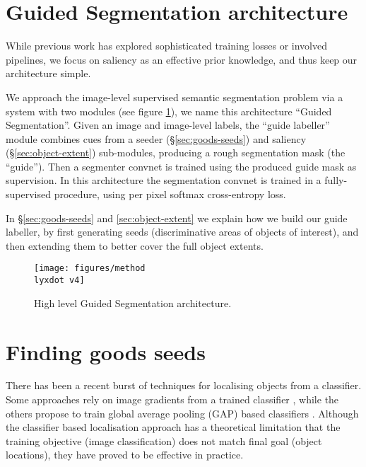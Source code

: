 \documentclass[british,10pt,twocolumn,letterpaper]{article}
\newcommand{\lyxdot}{.}
\begin{document}
\section{\label{sec:architecture} Guided Segmentation architecture}

While previous work has explored sophisticated training losses
or involved pipelines, we focus on saliency as an effective
prior knowledge, and thus keep our architecture simple.

We approach the image-level supervised semantic segmentation problem
via a system with two modules (see figure \ref{fig:high-level-architecture}),
we name this architecture ``Guided Segmentation''. Given an image
and image-level labels, the ``guide labeller'' module combines cues
from a seeder (\S\ref{sec:goods-seeds}) and saliency (\S\ref{sec:object-extent})
sub-modules, producing a rough segmentation mask (the ``guide'').
Then a segmenter convnet is trained using the produced guide mask
as supervision. In this architecture the segmentation convnet is trained
in a fully-supervised procedure, using per pixel softmax
cross-entropy loss. 

In \S \ref{sec:goods-seeds} and \ref{sec:object-extent} we
explain how we build our guide labeller, by first generating seeds
(discriminative areas of objects of interest), and then extending
them to better cover the full object extents. 

\begin{figure}
\begin{centering}
\texttt{[image: figures/method\\lyxdot v4]}
\par\end{centering}
\caption{\label{fig:high-level-architecture}High level Guided Segmentation
architecture. }
\end{figure}


\section{\label{sec:goods-seeds}Finding goods seeds}

\noindent There has been a recent burst of techniques for localising
objects from a classifier. Some approaches rely on image gradients
from a trained classifier \cite{Simonyan2014Iclr,Springenberg2015Iclrw,Zhang2016Eccv},
while the others propose to train global average pooling (GAP) based
 classifiers \cite{zhou2015cnnlocalization}. Although the classifier
 based localisation approach has a theoretical limitation that the
 training objective (image classification) does not match final goal
 (object locations), they have proved to be effective in practice.
 
\end{document}
